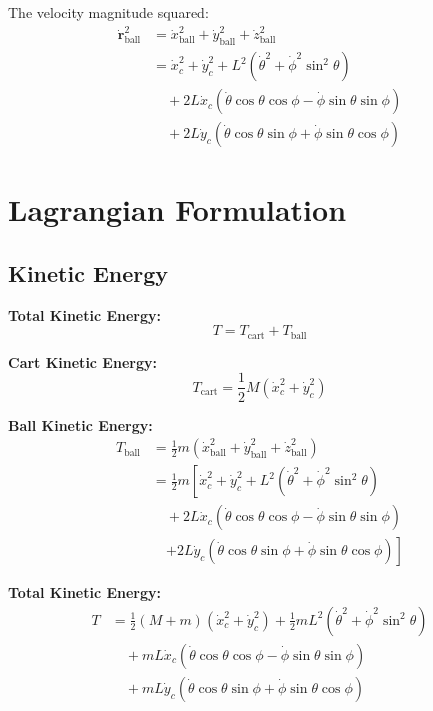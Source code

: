 \documentclass[12pt]{article}
\begin{document}
The velocity magnitude squared:
\begin{align}
    \dot{\mathbf{r}}_{\text{ball}}^2 &= \dot{x}_{\text{ball}}^2 + \dot{y}_{\text{ball}}^2 + \dot{z}_{\text{ball}}^2 \nonumber \\
    &= \dot{x}_c^2 + \dot{y}_c^2 + L^2(\dot{\theta}^2 + \dot{\phi}^2\sin^2\theta) \nonumber \\
    &\quad + 2L\dot{x}_c(\dot{\theta}\cos\theta\cos\phi - \dot{\phi}\sin\theta\sin\phi) \nonumber \\
    &\quad + 2L\dot{y}_c(\dot{\theta}\cos\theta\sin\phi + \dot{\phi}\sin\theta\cos\phi)
\end{align}

\section{Lagrangian Formulation}

\subsection{Kinetic Energy}

\textbf{Total Kinetic Energy:}
\begin{equation}
    T = T_{\text{cart}} + T_{\text{ball}}
\end{equation}

\textbf{Cart Kinetic Energy:}
\begin{equation}
    T_{\text{cart}} = \frac{1}{2}M(\dot{x}_c^2 + \dot{y}_c^2)
\end{equation}

\textbf{Ball Kinetic Energy:}
\begin{align}
    T_{\text{ball}} &= \frac{1}{2}m(\dot{x}_{\text{ball}}^2 + \dot{y}_{\text{ball}}^2 + \dot{z}_{\text{ball}}^2) \nonumber \\
    &= \frac{1}{2}m\left[\dot{x}_c^2 + \dot{y}_c^2 + L^2(\dot{\theta}^2 + \dot{\phi}^2\sin^2\theta) \right. \nonumber \\
    &\quad + 2L\dot{x}_c(\dot{\theta}\cos\theta\cos\phi - \dot{\phi}\sin\theta\sin\phi) \nonumber \\
    &\quad \left. + 2L\dot{y}_c(\dot{\theta}\cos\theta\sin\phi + \dot{\phi}\sin\theta\cos\phi)\right]
\end{align}

\textbf{Total Kinetic Energy:}
\begin{align}
    T &= \frac{1}{2}(M + m)(\dot{x}_c^2 + \dot{y}_c^2) + \frac{1}{2}mL^2(\dot{\theta}^2 + \dot{\phi}^2\sin^2\theta) \nonumber \\
    &\quad + mL\dot{x}_c(\dot{\theta}\cos\theta\cos\phi - \dot{\phi}\sin\theta\sin\phi) \nonumber \\
    &\quad + mL\dot{y}_c(\dot{\theta}\cos\theta\sin\phi + \dot{\phi}\sin\theta\cos\phi)
\end{align}
\end{document}
